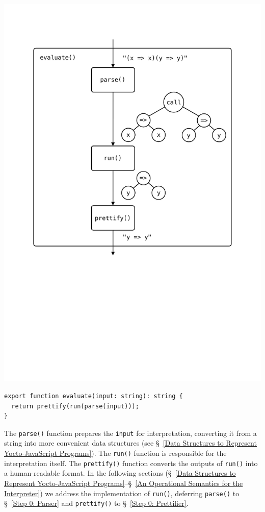 \documentclass[12pt, oneside]{book}
\begin{document}
\begin{center}
\includegraphics{images/architecture.pdf}
\end{center}

\begin{verbatim}
export function evaluate(input: string): string {
  return prettify(run(parse(input)));
}
\end{verbatim}

The \texttt{parse()} function prepares the \texttt{input} for interpretation, converting it from a string into more convenient data structures (see §~\ref{Data Structures to Represent Yocto-JavaScript Programs}). The \texttt{run()} function is responsible for the interpretation itself. The \texttt{prettify()} function converts the outputs of \texttt{run()} into a human-readable format. In the following sections (§~\ref{Data Structures to Represent Yocto-JavaScript Programs}–§~\ref{An Operational Semantics for the Interpreter}) we address the implementation of \texttt{run()}, deferring \texttt{parse()} to §~\ref{Step 0: Parser} and \texttt{prettify()} to §~\ref{Step 0: Prettifier}.
\end{document}
